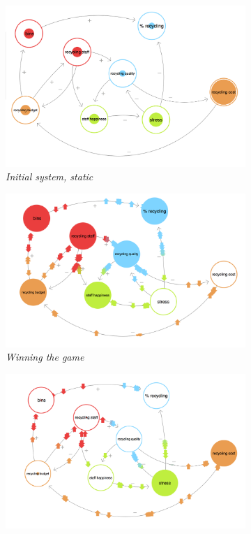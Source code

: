 \documentclass[nofonts,nols,justified,nobib]{tufte-book}
\begin{document}
\begin{figure}
  \centering
  \caption{Initial Experiments with \emph{Loopy!}}
  \label{optimising}
\begin{subfigure}{.3\textwidth}
  \centering
  \includegraphics[width=1\linewidth]{img/3/loopy/small-static.png}
\caption{\textit{Initial system, static}}
\end{subfigure}
 \quad
\begin{subfigure}{.3\textwidth}
  \centering
  \includegraphics[width=1\linewidth]{img/3/loopy/small-win.png}
\caption{\textit{Winning the game}}
  \label{small:win}
\end{subfigure}%
\quad
\begin{subfigure}{.3\textwidth}
  \centering
  \includegraphics[width=1\linewidth]{img/3/loopy/small-lose.png}

\end{subfigure}
\end{figure}
\end{document}
